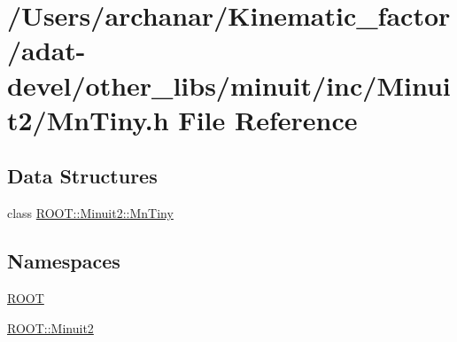 \hypertarget{adat-devel_2other__libs_2minuit_2inc_2Minuit2_2MnTiny_8h}{}\section{/\+Users/archanar/\+Kinematic\+\_\+factor/adat-\/devel/other\+\_\+libs/minuit/inc/\+Minuit2/\+Mn\+Tiny.h File Reference}
\label{adat-devel_2other__libs_2minuit_2inc_2Minuit2_2MnTiny_8h}
\subsection*{Data Structures}
\begin{DoxyCompactItemize}
\item 
class \mbox{\hyperlink{classROOT_1_1Minuit2_1_1MnTiny}{R\+O\+O\+T\+::\+Minuit2\+::\+Mn\+Tiny}}
\end{DoxyCompactItemize}
\subsection*{Namespaces}
\begin{DoxyCompactItemize}
\item 
 \mbox{\hyperlink{namespaceROOT}{R\+O\+OT}}
\item 
 \mbox{\hyperlink{namespaceROOT_1_1Minuit2}{R\+O\+O\+T\+::\+Minuit2}}
\end{DoxyCompactItemize}

